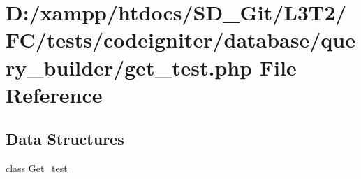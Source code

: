 \hypertarget{tests_2codeigniter_2database_2query__builder_2get__test_8php}{}\section{D\+:/xampp/htdocs/\+S\+D\+\_\+\+Git/\+L3\+T2/\+F\+C/tests/codeigniter/database/query\+\_\+builder/get\+\_\+test.php File Reference}
\label{tests_2codeigniter_2database_2query__builder_2get__test_8php}
\subsection*{Data Structures}
\begin{DoxyCompactItemize}
\item 
class \hyperlink{class_get__test}{Get\+\_\+test}
\end{DoxyCompactItemize}
